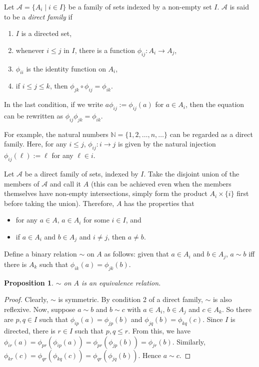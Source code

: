 \documentclass[12pt]{article}
\newtheorem{prop}{Proposition}
\begin{document}
Let $\mathcal{A}=\lbrace A_i\mid i\in I\rbrace$ be a family of sets indexed by a non-empty set $I$.  $\mathcal{A}$ is said to be a \emph{direct family} if 
\begin{enumerate}
\item $I$ is a directed set,
\item whenever $i\le j$ in $I$, there is a function $\phi_{ij}:A_i\to A_j$,
\item $\phi_{ii}$ is the identity function on $A_i$,
\item if $i\le j\le k$, then $\phi_{jk}\circ \phi_{ij}=\phi_{ik}$.
\end{enumerate}

In the last condition, if we write $a \phi_{ij}:=\phi_{ij}(a)$ for $a\in A_i$, then the equation can be rewritten as $\phi_{ij}\phi_{jk}=\phi_{ik}$.

For example, the natural numbers $\mathbb{N}=\lbrace 1,2,\ldots, n,\ldots \rbrace$ can be regarded as a direct family.  Here, for any $i\le j$, $\phi_{ij}:i\to j$ is given by the natural injection $\phi_{ij}(\ell):=\ell$ for any $\ell \in i$.

Let $\mathcal{A}$ be a direct family of sets, indexed by $I$.  Take the disjoint union of the members of $\mathcal{A}$ and call it $A$ (this can be achieved even when the members themselves have non-empty intersections, simply form the product $A_i\times \lbrace i\rbrace$ first before taking the union).  Therefore, $A$ has the properties that 
\begin{itemize}
\item for any $a\in A$, $a\in A_i$ for some $i\in I$, and 
\item if $a\in A_i$ and $b\in A_j$ and $i\ne j$, then $a\ne b$.
\end{itemize}
Define a binary relation $\sim$ on $A$ as follows: given that $a\in A_i$ and $b\in A_j$, $a\sim b$ iff there is $A_k$ such that $\phi_{ik}(a)=\phi_{jk}(b)$.

\begin{prop} $\sim$ on $A$ is an equivalence relation. \end{prop}
\begin{proof}  Clearly, $\sim$ is symmetric.  By condition 2 of a direct family, $\sim$ is also reflexive.  Now, suppose $a\sim b$ and $b\sim c$ with $a\in A_i$, $b\in A_j$ and $c\in A_k$.  So there are $p,q\in I$ such that $\phi_{ip}(a)=\phi_{jp}(b)$ and $\phi_{jq}(b)=\phi_{kq}(c)$.  Since $I$ is directed, there is $r\in I$ such that $p,q\le r$.  From this, we have $\phi_{ir}(a)=\phi_{pr}(\phi_{ip}(a))=\phi_{pr}(\phi_{jp}(b))=\phi_{jr}(b)$.  Similarly, $\phi_{kr}(c)=\phi_{qr}(\phi_{kq}(c))=\phi_{qr}(\phi_{jq}(b))$.  Hence $a\sim c$.
\end{proof}
\end{document}
